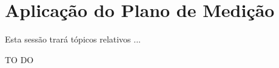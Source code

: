 \chapter[Aplicação do Plano de Medição]{Aplicação do Plano de Medição}

Esta sessão trará tópicos relativos ...

TO DO

